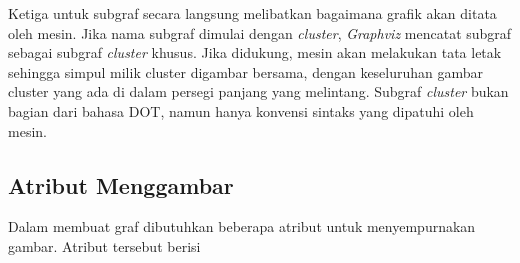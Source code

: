 Ketiga untuk subgraf secara langsung melibatkan bagaimana grafik akan ditata oleh mesin. Jika nama subgraf dimulai dengan \textit{cluster}, \textit{Graphviz} mencatat subgraf sebagai subgraf \textit{cluster} khusus. Jika didukung, mesin akan melakukan tata letak sehingga simpul milik cluster digambar bersama, dengan keseluruhan gambar cluster yang ada di dalam persegi panjang yang melintang. Subgraf \textit{cluster} bukan bagian dari bahasa DOT, namun hanya konvensi sintaks yang dipatuhi oleh mesin.  


\subsection{Atribut Menggambar}
\label{sec: Atribut Menggambar}
Dalam membuat graf dibutuhkan beberapa atribut untuk menyempurnakan gambar. Atribut tersebut berisi 
